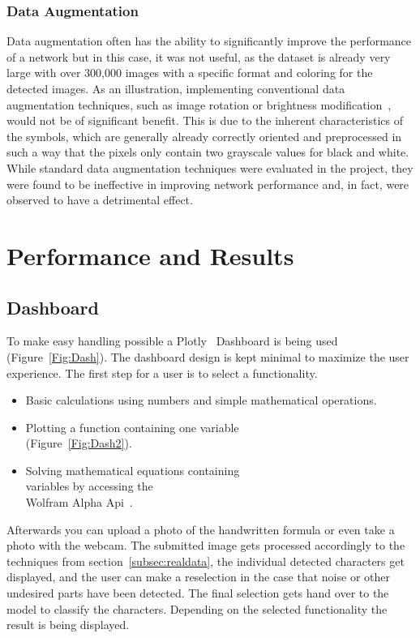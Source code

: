 \documentclass[@CLASSOPTIONS@]{tumarticle}
\begin{document}
\subsubsection{Data Augmentation}
Data augmentation often has the ability to significantly improve the performance of a network but in this case, it
was not useful, as the dataset is already very large with over 300,000 images with a specific format and coloring for
the detected images.
As an illustration, implementing conventional data augmentation techniques, such as image rotation or brightness
modification~\cite{DataAugm}, would not be of significant benefit.
This is due to the inherent characteristics of the symbols, which are generally already correctly oriented and
preprocessed in such a way that the pixels only contain two grayscale values for black and white.
While standard data augmentation techniques were evaluated in the project, they were found to be ineffective in
improving network performance and, in fact, were observed to have a detrimental effect.

\section{Performance and Results}
\label{sec:customization}

\subsection{Dashboard}
\label{subsec:dash}
To make easy handling possible a Plotly~\cite{plotly} Dashboard is being used (Figure~\ref{Fig:Dash}).
The dashboard design is kept minimal to maximize the user experience.
The first step for a user is to select a functionality.
\begin{itemize}
\item Basic calculations using numbers and simple mathematical operations.
\item Plotting a function containing one variable\\ (Figure~\ref{Fig:Dash2}).
\item Solving mathematical equations containing\\variables by accessing the\\
Wolfram Alpha Api~\cite{wolfram}.
\end{itemize}
Afterwards you can upload a photo of the handwritten formula or even take a photo
with the webcam.
The submitted image gets processed accordingly to the techniques from section~\ref{subsec:realdata},
the individual detected characters get displayed, and the user can make a reselection
in the case that noise or other undesired parts have been detected.
The final selection gets hand over to the model to classify the characters.
Depending on the selected functionality the result is being displayed.
\end{document}
